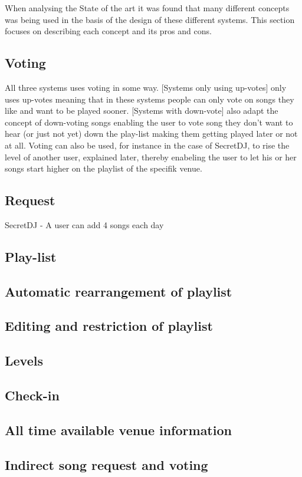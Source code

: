 When analysing the State of the art it was found that many different concepts was being used in the basis of the design of these different systems. This section focuses on describing each concept and its pros and cons.

\subsection{Voting}
All three systems uses voting in some way. [Systems only using up-votes] only uses up-votes meaning that in these systems people can only vote on songs they like and want to be played sooner. [Systems with down-vote] also adapt the concept of down-voting songs enabling the user to vote song they don't want to hear (or just not yet) down the play-list making them getting played later or not at all.
Voting can also be used, for instance in the case of SecretDJ, to rise the level of another user, explained later, thereby enabeling the user to let his or her songs start higher on the playlist of the specifik venue.

\subsection{Request}
SecretDJ - A user can add 4 songs each day


\subsection{Play-list}


\subsection{Automatic rearrangement of playlist}

\subsection{Editing and restriction of playlist}

\subsection{Levels}

\subsection{Check-in}

\subsection{All time available venue information}

\subsection{Indirect song request and voting}
